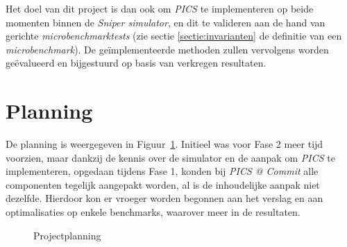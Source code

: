 \documentclass[12pt,a4paper,faculty=ea,language=nl]{ugent-doc}
\begin{document}
Het doel van dit project is dan ook om \textit{PICS} te implementeren op beide momenten binnen de \textit{Sniper simulator}, en dit te valideren aan de hand van gerichte \textit{microbenchmarktests} (zie sectie \ref{sectie:invarianten} de definitie van een \textit{microbenchmark}). De geïmplementeerde methoden zullen vervolgens worden geëvalueerd en bijgestuurd op basis van verkregen resultaten.


\section{Planning}
De planning is weergegeven in Figuur~\ref{fig:planning}. Initieel was voor Fase 2 meer tijd voorzien, maar dankzij de kennis over de simulator en de aanpak om \textit{PICS} te implementeren, opgedaan tijdens Fase 1, konden bij \textit{PICS @ Commit} alle componenten tegelijk aangepakt worden, al is de inhoudelijke aanpak niet dezelfde. Hierdoor kon er vroeger worden begonnen aan het verslag en aan optimalisaties op enkele benchmarks, waarover meer in de resultaten.
\begin{figure}[H]
    \centering
    \caption{Projectplanning}
    \label{fig:planning}
\end{figure}
\end{document}
